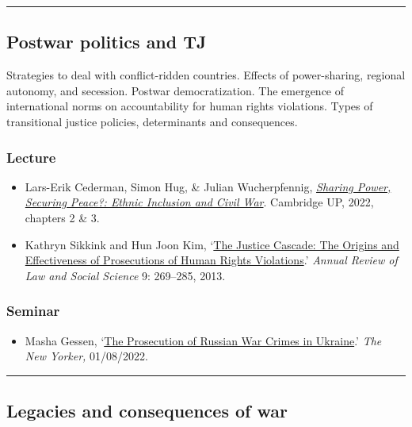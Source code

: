 \documentclass[12pt, a4paper]{article}
\begin{document}
\hrule %

\subsection{Postwar politics and TJ}

Strategies to deal with conflict-ridden countries. Effects of power-sharing, regional autonomy, and secession. Postwar democratization. The emergence of international norms on accountability for human rights violations. Types of transitional justice policies, determinants and consequences.

\subsubsection*{Lecture}

\begin{itemize}
\setlength\itemsep{0pt}
\item Lars-Erik Cederman, Simon Hug, \& Julian Wucherpfennig, \href{https://doi.org/10.1017/9781108284639}{\textit{Sharing Power, Securing Peace?: Ethnic Inclusion and Civil War}}. Cambridge UP, 2022, chapters 2 \& 3.
\item Kathryn Sikkink and Hun Joon Kim, `\href{https://doi.org/10.1146/annurev-lawsocsci-102612-133956}{The Justice Cascade: The Origins and Effectiveness of Prosecutions of Human Rights Violations}.' \textit{Annual Review of Law and Social Science} 9: 269--285, 2013.
\end{itemize}

\subsubsection*{Seminar}

\begin{itemize}
\setlength\itemsep{0pt}
\item Masha Gessen, `\href{https://www.newyorker.com/magazine/2022/08/08/the-prosecution-of-russian-war-crimes-in-ukraine}{The Prosecution of Russian War Crimes in Ukraine}.' \textit{The New Yorker,} 01/08/2022.
\end{itemize}

\hrule %

\subsection{Legacies and consequences of war}
\end{document}
